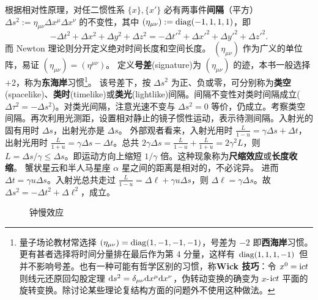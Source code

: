 根据相对性原理，对任二惯性系 $\{x\},\{x'\}$ 必有两事件\textbf{间隔}（平方）$\Delta s^2:={\eta}_{\mu\nu}\Delta x^\mu\Delta x^\nu$ 的不变性，其中 $({\eta}_{\mu\nu}):=\operatorname{diag}(-1,1,1,1)$，即
\[-\Delta t^2+\Delta x^2+\Delta y^2+\Delta z^2=-\Delta t'^2+\Delta x'^2+\Delta y'^2+\Delta z'^2.\]
而 Newton 理论则分开定义绝对时间长度和空间长度。
$(\eta_{\mu\nu})$ 作为广义的单位阵，易证 $(\eta_{\mu\nu})=(\eta^{\mu\nu})$。
定义\textbf{号差}(signature)为 $(\eta_{\mu\nu})$ 的迹，本书一般选择 $+2$，称为\textbf{东海岸}习惯\footnote{量子场论教材常选择 $(\eta_{\mu\nu})=\operatorname{diag}(1,-1,-1,-1)$，号差为 $-2$ 即\textbf{西海岸}习惯。更有甚者选择将时间分量排在最后作为第 4 分量，这样有 $\operatorname{diag}(1,1,1,-1)$ 但并不影响号差。也有一种可能有哲学区别的习惯，称\textbf{Wick 技巧}：令 $x^0=\mathrm{i} ct$ 则线元还原回勾股定理 $\dd s^2= \delta_{\mu\nu}\dd x^\mu\dd x^\nu$，伪转动变换的确变为 $x$-$\mathrm{i} ct$ 平面的旋转变换。除讨论某些理论复结构方面的问题外不使用这种做法。}。
该号差下，按 $\Delta s^2$ 为正、负或零，可分别称为\textbf{类空}(spacelike)、\textbf{类时}(timelike)或\textbf{类光}(lightlike)间隔。间隔不变性对类时间隔成立($\Delta\tau^2=-\Delta s^2$)。对类光间隔，注意光速不变与 $\Delta s^2=0$ 等价，仍成立。考察类空间隔。再次利用光测距，设置相对静止的镜子惯性运动，表示待测间隔。入射光的固有用时 $\Delta s$，出射光亦是 $\Delta s$。
外部观者看来，入射光用时 $\frac{L}{1-u}=\gamma\Delta s+\Delta t$，出射光用时 $\frac{L}{1+u}=\gamma\Delta s-\Delta t$。总共 $2\gamma\Delta s=\frac{L}{1-u}+\frac{L}{1+u}=2\gamma^2L$，则 $L=\Delta s/\gamma\leqslant\Delta s$。即运动方向上缩短 $1/\gamma$ 倍。这种现象称为\textbf{尺缩效应}或\textbf{长度收缩}。
蟹状星云和半人马星座 $\alpha$ 星之间的距离是相对的，不必诧异。
进而 $\Delta t=\gamma u\Delta s$。入射光总共走过 $\frac{L}{1-u}=\Delta\ell+\gamma u\Delta s$，则 $\Delta\ell = \gamma\Delta s$。故 $\Delta s^2=-\Delta t^2+\Delta\ell^2$，成立。

    \begin{figure}[t]
        \centering
        \qquad
        \caption{钟慢效应}
    \end{figure}


